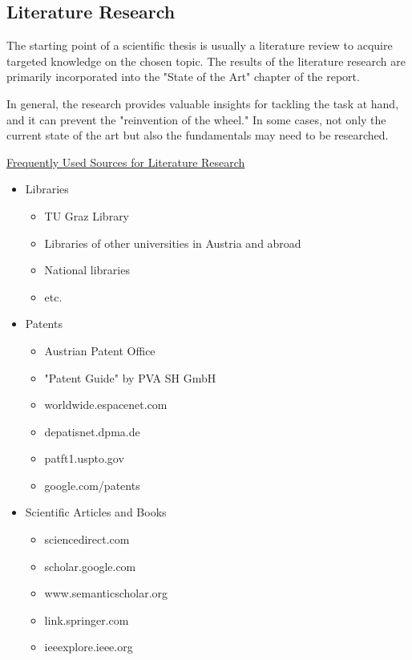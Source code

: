\subsection{Literature Research}
\label{sec:literatureResearch}

The starting point of a scientific thesis is usually a literature review to acquire targeted knowledge on the chosen topic. The results of the literature research are primarily incorporated into the "State of the Art" chapter of the report.

In general, the research provides valuable insights for tackling the task at hand, and it can prevent the "reinvention of the wheel." In some cases, not only the current state of the art but also the fundamentals may need to be researched.

\underline{Frequently Used Sources for Literature Research}
\begin{itemize}
    \item Libraries
    \begin{itemize}
        \item TU Graz Library
        \item Libraries of other universities in Austria and abroad
        \item National libraries
        \item etc.
    \end{itemize}
    \item Patents
    \begin{itemize}
        \item Austrian Patent Office
        \item "Patent Guide" by PVA SH GmbH
        \item worldwide.espacenet.com
        \item depatisnet.dpma.de
        \item patft1.uspto.gov
        \item google.com/patents
    \end{itemize}
    \item Scientific Articles and Books
    \begin{itemize}
        \item sciencedirect.com
        \item scholar.google.com
        \item www.semanticscholar.org
        \item link.springer.com
        \item ieeexplore.ieee.org
    \end{itemize}    
\end{itemize}



